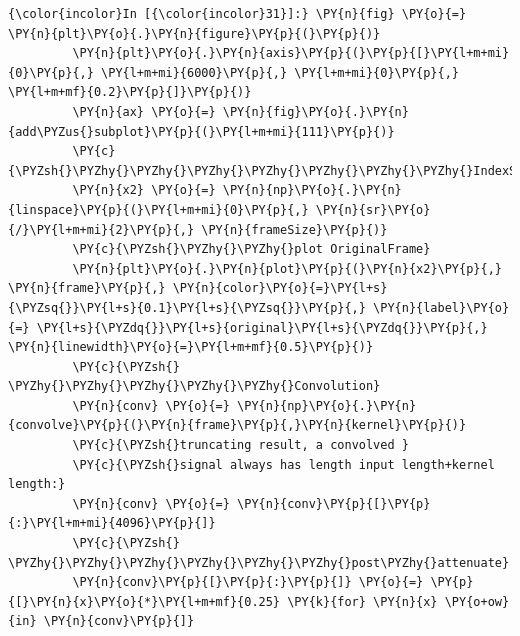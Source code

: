     \begin{Verbatim}[commandchars=\\\{\}]
{\color{incolor}In [{\color{incolor}31}]:} \PY{n}{fig} \PY{o}{=} \PY{n}{plt}\PY{o}{.}\PY{n}{figure}\PY{p}{(}\PY{p}{)}
         \PY{n}{plt}\PY{o}{.}\PY{n}{axis}\PY{p}{(}\PY{p}{[}\PY{l+m+mi}{0}\PY{p}{,} \PY{l+m+mi}{6000}\PY{p}{,} \PY{l+m+mi}{0}\PY{p}{,} \PY{l+m+mf}{0.2}\PY{p}{]}\PY{p}{)}
         \PY{n}{ax} \PY{o}{=} \PY{n}{fig}\PY{o}{.}\PY{n}{add\PYZus{}subplot}\PY{p}{(}\PY{l+m+mi}{111}\PY{p}{)}
         \PY{c}{\PYZsh{}\PYZhy{}\PYZhy{}\PYZhy{}\PYZhy{}\PYZhy{}\PYZhy{}\PYZhy{}IndexSIgnal}
         \PY{n}{x2} \PY{o}{=} \PY{n}{np}\PY{o}{.}\PY{n}{linspace}\PY{p}{(}\PY{l+m+mi}{0}\PY{p}{,} \PY{n}{sr}\PY{o}{/}\PY{l+m+mi}{2}\PY{p}{,} \PY{n}{frameSize}\PY{p}{)}
         \PY{c}{\PYZsh{}\PYZhy{}\PYZhy{}plot OriginalFrame}
         \PY{n}{plt}\PY{o}{.}\PY{n}{plot}\PY{p}{(}\PY{n}{x2}\PY{p}{,} \PY{n}{frame}\PY{p}{,} \PY{n}{color}\PY{o}{=}\PY{l+s}{\PYZsq{}}\PY{l+s}{0.1}\PY{l+s}{\PYZsq{}}\PY{p}{,} \PY{n}{label}\PY{o}{=} \PY{l+s}{\PYZdq{}}\PY{l+s}{original}\PY{l+s}{\PYZdq{}}\PY{p}{,} \PY{n}{linewidth}\PY{o}{=}\PY{l+m+mf}{0.5}\PY{p}{)}
         \PY{c}{\PYZsh{} \PYZhy{}\PYZhy{}\PYZhy{}\PYZhy{}\PYZhy{}Convolution}
         \PY{n}{conv} \PY{o}{=} \PY{n}{np}\PY{o}{.}\PY{n}{convolve}\PY{p}{(}\PY{n}{frame}\PY{p}{,}\PY{n}{kernel}\PY{p}{)}
         \PY{c}{\PYZsh{}truncating result, a convolved }
         \PY{c}{\PYZsh{}signal always has length input length+kernel length:}
         \PY{n}{conv} \PY{o}{=} \PY{n}{conv}\PY{p}{[}\PY{p}{:}\PY{l+m+mi}{4096}\PY{p}{]}
         \PY{c}{\PYZsh{} \PYZhy{}\PYZhy{}\PYZhy{}\PYZhy{}\PYZhy{}\PYZhy{}post\PYZhy{}attenuate}
         \PY{n}{conv}\PY{p}{[}\PY{p}{:}\PY{p}{]} \PY{o}{=} \PY{p}{[}\PY{n}{x}\PY{o}{*}\PY{l+m+mf}{0.25} \PY{k}{for} \PY{n}{x} \PY{o+ow}{in} \PY{n}{conv}\PY{p}{]}
         

\end{Verbatim}
